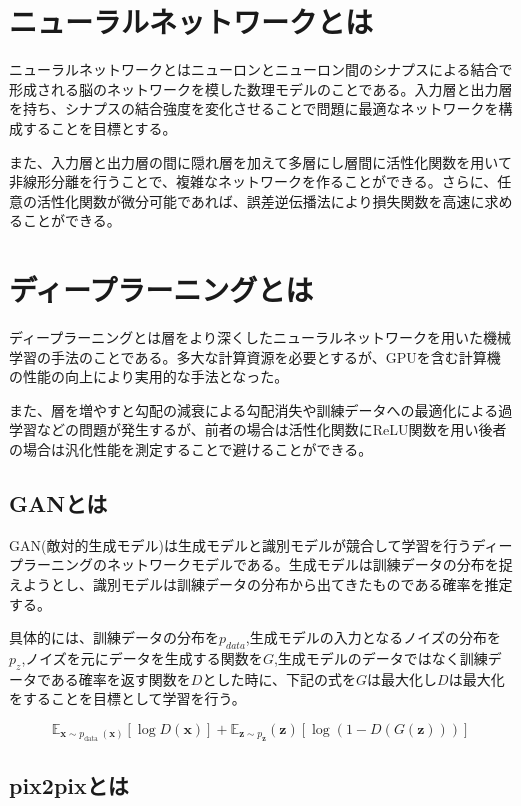 \section{ニューラルネットワークとは}
ニューラルネットワークとはニューロンとニューロン間のシナプスによる結合で形成される脳のネットワークを模した数理モデルのことである。入力層と出力層を持ち、シナプスの結合強度を変化させることで問題に最適なネットワークを構成することを目標とする。\par
また、入力層と出力層の間に隠れ層を加えて多層にし層間に活性化関数を用いて非線形分離を行うことで、複雑なネットワークを作ることができる。さらに、任意の活性化関数が微分可能であれば、誤差逆伝播法により損失関数を高速に求めることができる。\par


\section{ディープラーニングとは}
ディープラーニングとは層をより深くしたニューラルネットワークを用いた機械学習の手法のことである。多大な計算資源を必要とするが、GPUを含む計算機の性能の向上により実用的な手法となった。\par
また、層を増やすと勾配の減衰による勾配消失や訓練データへの最適化による過学習などの問題が発生するが、前者の場合は活性化関数にReLU関数を用い後者の場合は汎化性能を測定することで避けることができる。\par

\subsection{GANとは}
GAN(敵対的生成モデル)は生成モデルと識別モデルが競合して学習を行うディープラーニングのネットワークモデルである。生成モデルは訓練データの分布を捉えようとし、識別モデルは訓練データの分布から出てきたものである確率を推定する。\par
具体的には、訓練データの分布を$p_{data}$,生成モデルの入力となるノイズの分布を$p_z$,ノイズを元にデータを生成する関数を$G$,生成モデルのデータではなく訓練データである確率を返す関数を$D$とした時に、下記の式を$G$は最大化し$D$は最大化をすることを目標として学習を行う\cite{GAN}。

$$\mathbb{E}_{\boldsymbol{x} \sim p_{\text {data }}(\boldsymbol{x})}[\log D(\boldsymbol{x})]+\mathbb{E}_{\boldsymbol{z} \sim p_{\boldsymbol{z}}}(\boldsymbol{z})[\log (1-D(G(\boldsymbol{z})))]$$

\subsection{pix2pixとは}




